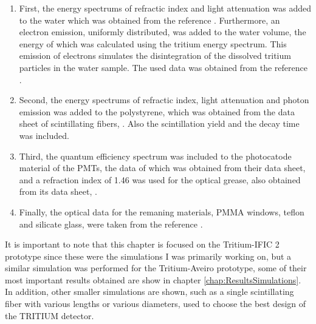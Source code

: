 \begin{enumerate}

\item{} First, the energy spectrums of refractic index and light attenuation was added to the water which was obtained from the reference \cite{WaterPropertiesSimulation}. Furthermore, an electron emission, uniformly distributed, was added to the water volume, the energy of which was calculated using the tritium energy spectrum. This emission of electrons simulates the disintegration of the dissolved tritium particles in the water sample. The used data was obtained from the reference \cite{TritiumEmissionSpectrum}.

\item{} Second, the energy spectrums of refractic index, light attenuation and photon emission was added to the polystyrene, which was obtained from the data sheet of scintillating fibers, \cite{DataSheetBCF12Fiber}.  Also the scintillation yield and the decay time was included. 

\item{} Third, the quantum efficiency spectrum was included to the photocatode material of the PMTs, the data of which was obtained from their data sheet, \cite{DataSheetPMTs} and a refraction index of 1.46 was used for the optical grease, also obtained from its data sheet, \cite{OpticalGrease}.

\item{} Finally, the optical data for the remaning materials, PMMA windows, teflon and silicate glass, were taken from the reference \cite{NEMODataSimulation}.

\end{enumerate} 

It is important to note that this chapter is focused on the Tritium-IFIC 2 prototype since these were the simulations I was primarily working on, but a similar simulation was performed for the Tritium-Aveiro prototype, some of their most important results obtained are show in chapter \ref{chap:ResultsSimulations}. In addition, other smaller simulations are shown, such as a single scintillating fiber with various lengths or various diameters, used to choose the best design of the TRITIUM detector.